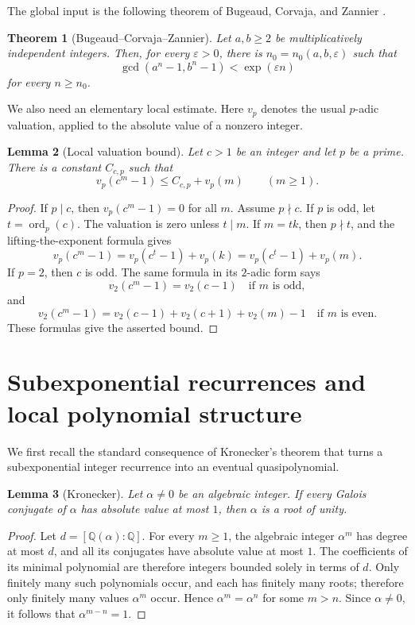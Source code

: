\documentclass[11pt]{amsart}
\newtheorem{theorem}{Theorem}[section]
\newtheorem{lemma}[theorem]{Lemma}
\theoremstyle{remark}
\numberwithin{equation}{section}
\newcommand{\Q}{\mathbb Q}
\newcommand{\ord}{\operatorname{ord}}
\begin{document}
The global input is the following theorem of Bugeaud, Corvaja, and Zannier
\cite[Theorem~1]{BCZ03}.

\begin{theorem}[Bugeaud--Corvaja--Zannier]\label{thm:BCZ}
Let $a,b\ge 2$ be multiplicatively independent integers.  Then, for every
$\varepsilon>0$, there is $n_0=n_0(a,b,\varepsilon)$ such that
\[
  \gcd(a^n-1,b^n-1)<\exp(\varepsilon n)
\]
for every $n\ge n_0$.
\end{theorem}

We also need an elementary local estimate.  Here $v_p$ denotes the usual
$p$-adic valuation, applied to the absolute value of a nonzero integer.

\begin{lemma}[Local valuation bound]\label{lem:valuation-bound}
Let $c>1$ be an integer and let $p$ be a prime.  There is a constant
$C_{c,p}$ such that
\[
  v_p(c^m-1)\le C_{c,p}+v_p(m)
  \qquad(m\ge 1).
\]
\end{lemma}

\begin{proof}
If $p\mid c$, then $v_p(c^m-1)=0$ for all $m$.  Assume $p\nmid c$.
If $p$ is odd, let $t=\ord_p(c)$.  The valuation is zero unless $t\mid m$.
If $m=tk$, then $p\nmid t$, and the lifting-the-exponent formula gives
\[
  v_p(c^m-1)=v_p(c^t-1)+v_p(k)
            =v_p(c^t-1)+v_p(m).
\]
If $p=2$, then $c$ is odd.  The same formula in its $2$-adic form says
\[
  v_2(c^m-1)=v_2(c-1)\quad\text{if $m$ is odd},
\]
and
\[
  v_2(c^m-1)=v_2(c-1)+v_2(c+1)+v_2(m)-1
  \quad\text{if $m$ is even}.
\]
These formulas give the asserted bound.
\end{proof}

\section{Subexponential recurrences and local polynomial structure}
\label{sec:subexponential}

We first recall the standard consequence of Kronecker's theorem that turns a
subexponential integer recurrence into an eventual quasipolynomial.

\begin{lemma}[Kronecker]\label{lem:kronecker}
Let $\alpha\ne 0$ be an algebraic integer.  If every Galois conjugate of
$\alpha$ has absolute value at most $1$, then $\alpha$ is a root of unity.
\end{lemma}

\begin{proof}
Let $d=[\Q(\alpha):\Q]$.  For every $m\ge 1$, the algebraic integer
$\alpha^m$ has degree at most $d$, and all its conjugates have absolute value at
most $1$.  The coefficients of its minimal polynomial are therefore integers
bounded solely in terms of $d$.  Only finitely many such polynomials occur, and each has finitely many roots;
therefore only finitely many values $\alpha^m$ occur.  Hence
$\alpha^m=\alpha^n$ for some $m>n$.  Since $\alpha\ne 0$, it follows that
$\alpha^{m-n}=1$.
\end{proof}
\end{document}
